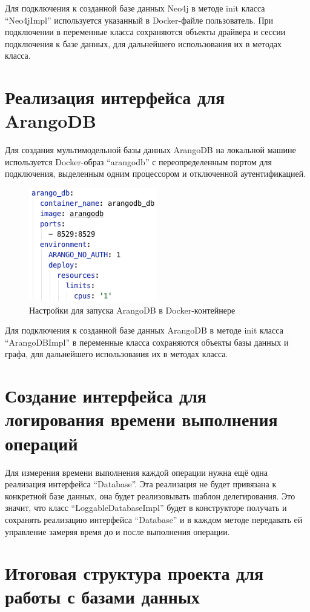 Для подключения к созданной базе данных Neo4j в методе init класса “Neo4jImpl” используется указанный в Docker-файле пользователь. При
подключении в переменные класса сохраняются объекты драйвера и сессии подключения к базе данных, для дальнейшего использования их в методах класса.


\section{Реализация интерфейса для ArangoDB}

Для создания мультимодельной базы данных ArangoDB на локальной машине используется Docker-образ “arangodb” с переопределенным портом для
подключения, выделенным одним процессором и отключенной аутентификацией.

\begin{figure}[ht!]
    \center
    \includegraphics [scale=0.7] {my_folder/myimg//6}
    \caption{Настройки для запуска ArangoDB в Docker-контейнере}
\end{figure}

Для подключения к созданной базе данных ArangoDB в методе init класса “ArangoDBImpl” в переменные класса сохраняются объекты базы данных и
графа, для дальнейшего использования их в методах класса.


\section{Создание интерфейса для логирования времени выполнения операций}

Для измерения времени выполнения каждой операции нужна ещё одна реализация интерфейса “Database”. Эта реализация не будет привязана к
конкретной базе данных, она будет реализовывать шаблон делегирования. Это значит, что класс “LoggableDatabaseImpl” будет в конструкторе
получать и сохранять реализацию интерфейса “Database” и в каждом методе передавать ей управление замеряя время до и после выполнения операции.


\section{Итоговая структура проекта для работы с базами данных}

